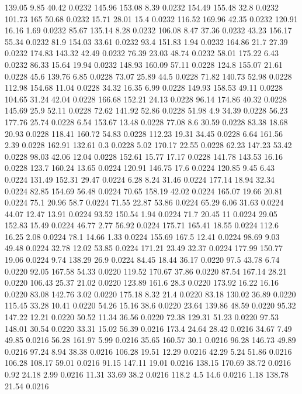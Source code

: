 139.05	9.85	40.42	0.0232
145.96	153.08	8.39	0.0232
154.49	155.48	32.8	0.0232
101.73	165	50.68	0.0232
15.71	28.01	15.4	0.0232
116.52	169.96	42.35	0.0232
120.91	16.16	1.69	0.0232
85.67	135.14	8.28	0.0232
106.08	8.47	37.36	0.0232
43.23	156.17	55.34	0.0232
81.9	154.03	33.61	0.0232
93.4	151.83	1.94	0.0232
164.86	21.7	27.39	0.0232
174.83	143.32	42.49	0.0232
76.39	23.03	48.74	0.0232
58.01	175.22	6.43	0.0232
86.33	15.64	19.94	0.0232
148.93	160.09	57.11	0.0228
124.8	155.07	21.61	0.0228
45.6	139.76	6.85	0.0228
73.07	25.89	44.5	0.0228
71.82	140.73	52.98	0.0228
112.98	154.68	11.04	0.0228
34.32	16.35	6.99	0.0228
149.93	158.53	49.11	0.0228
104.65	31.24	42.04	0.0228
166.68	152.21	24.13	0.0228
96.14	174.86	40.32	0.0228
145.69	25.9	52.11	0.0228
72.62	141.92	52.86	0.0228
51.98	4.9	34.39	0.0228
56.23	177.76	25.74	0.0228
6.54	153.67	13.48	0.0228
77.08	8.6	30.59	0.0228
83.38	18.68	20.93	0.0228
118.41	160.72	54.83	0.0228
112.23	19.31	34.45	0.0228
6.64	161.56	2.39	0.0228
162.91	132.61	0.3	0.0228
5.02	170.17	22.55	0.0228
62.23	147.23	53.42	0.0228
98.03	42.06	12.04	0.0228
152.61	15.77	17.17	0.0228
141.78	143.53	16.16	0.0228
123.7	160.24	13.65	0.0224
120.91	146.75	17.6	0.0224
120.85	9.45	6.43	0.0224
131.49	152.31	29.47	0.0224
6.28	8.24	31.46	0.0224
177.14	18.94	32.34	0.0224
82.85	154.69	56.48	0.0224
70.65	158.19	42.02	0.0224
165.07	19.66	20.81	0.0224
75.1	20.96	58.7	0.0224
71.55	22.87	53.86	0.0224
65.29	6.06	31.63	0.0224
44.07	12.47	13.91	0.0224
93.52	150.54	1.94	0.0224
71.7	20.45	11	0.0224
29.05	152.83	15.49	0.0224
46.77	2.77	56.92	0.0224
175.71	165.41	18.55	0.0224
112.6	16.25	2.08	0.0224
78.1	14.66	1.33	0.0224
155.69	167.5	12.41	0.0224
98.69	9.03	49.48	0.0224
32.78	12.02	53.85	0.0224
171.21	23.49	32.37	0.0224
177.99	150.77	19.06	0.0224
9.74	138.29	26.9	0.0224
84.45	18.44	36.17	0.0220
97.5	43.78	6.74	0.0220
92.05	167.58	54.33	0.0220
119.52	170.67	37.86	0.0220
87.54	167.14	28.21	0.0220
106.43	25.37	21.02	0.0220
123.89	161.6	28.3	0.0220
173.92	16.22	16.16	0.0220
83.08	142.76	3.02	0.0220
175.18	8.32	21.4	0.0220
83.18	130.02	36.89	0.0220
115.45	33.28	10.41	0.0220
54.26	15.16	38.6	0.0220
23.64	139.86	48.59	0.0220
95.32	147.22	12.21	0.0220
50.52	11.34	36.56	0.0220
72.38	129.31	51.23	0.0220
97.53	148.01	30.54	0.0220
33.31	15.02	56.39	0.0216
173.4	24.64	28.42	0.0216
34.67	7.49	49.85	0.0216
56.28	161.97	5.99	0.0216
35.65	160.57	30.1	0.0216
96.28	146.73	49.89	0.0216
97.24	8.94	38.38	0.0216
106.28	19.51	12.29	0.0216
42.29	5.24	51.86	0.0216
106.28	108.17	59.01	0.0216
91.15	147.11	19.01	0.0216
138.15	170.69	38.72	0.0216
0.92	24.18	2.99	0.0216
11.31	33.69	38.2	0.0216
118.2	4.5	14.6	0.0216
1.18	138.78	21.54	0.0216
